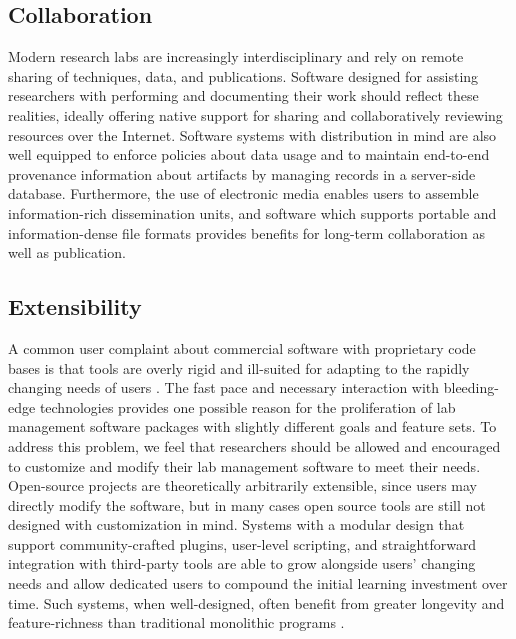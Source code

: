 \documentclass[../thesis]{subfiles}
\begin{document}
\subsection{Collaboration}
Modern research labs are increasingly interdisciplinary and rely on
remote sharing of techniques, data, and publications. Software
designed for assisting researchers with performing and documenting
their work should reflect these realities, ideally offering native
support for sharing and collaboratively reviewing resources over the
Internet. Software systems with distribution in mind are also well
equipped to enforce policies about data usage and to maintain
end-to-end provenance information about \glspl{artifact} by managing records
in a server-side database. Furthermore, the use of electronic media
enables users to assemble information-rich dissemination units, and
software which supports portable and information-dense file formats
provides benefits for long-term collaboration as well as publication.

\subsection{Extensibility}
A common user complaint about commercial software with proprietary
code bases is that tools are overly rigid and ill-suited for adapting
to the rapidly changing needs of users \cite{morgan2007benefits}.  The
fast pace and necessary interaction with bleeding-edge technologies
provides one possible reason for the proliferation of lab management
software packages with slightly different goals and feature sets. To
address this problem, we feel that researchers should be allowed and
encouraged to customize and modify their lab management software to
meet their needs. Open-source projects are theoretically arbitrarily
extensible, since users may directly modify the software, but in many
cases open source tools are still not designed with customization in
mind. Systems with a modular design that support community-crafted
plugins, user-level scripting, and straightforward integration with
third-party tools are able to grow alongside users' changing needs and
allow dedicated users to compound the initial learning investment over
time. Such systems, when well-designed, often benefit from greater
longevity and feature-richness than traditional monolithic programs
\cite{Emacs, SuperCollider}.
\end{document}

